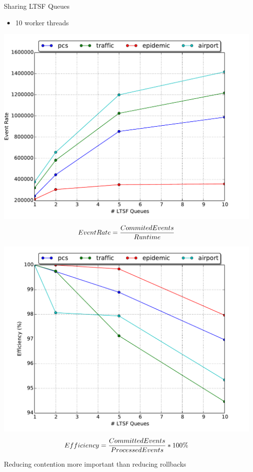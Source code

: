\documentclass[10pt]{beamer}
\begin{document}
\begin{frame}{Sharing LTSF Queues}
    \begin{itemize}
        \item 10 worker threads
    \end{itemize}
    \begin{minipage}{0.5\textwidth}
        \includegraphics[width=\textwidth]{../figs/pending_event_set/ltsf_event_rate.pdf}
        $$EventRate={CommitedEvents \over Runtime}$$
    \end{minipage}%
    \begin{minipage}{0.5\textwidth}
        \includegraphics[width=\textwidth]{../figs/pending_event_set/ltsf_efficiency.pdf}
        $$Efficiency={CommittedEvents \over ProcessedEvents}*100 \%$$
    \end{minipage}
    \begin{block}{Reducing contention more important than reducing rollbacks}\end{block}
\end{frame}
\end{document}
